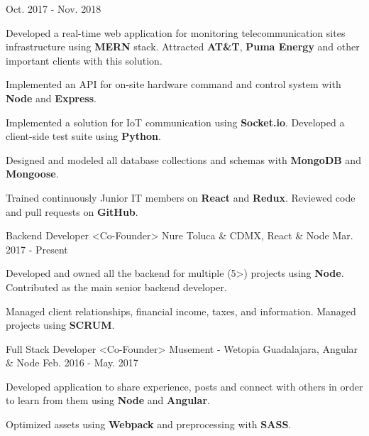 \begin{cventries}
    {Oct. 2017 - Nov. 2018}
    {
      \begin{cvitems}
        \item {Developed a real-time web application for monitoring telecommunication sites infrastructure using \textbf{MERN} stack. Attracted \textbf{AT\&T}, \textbf{Puma Energy} and other important clients with this solution.}
        \item {Implemented an API for on-site hardware command and control system with \textbf{Node} and \textbf{Express}.}
        \item {Implemented a solution for IoT communication using \textbf{Socket.io}. Developed a client-side test suite using \textbf{Python}.}
        \item {Designed and modeled all database collections and schemas with \textbf{MongoDB} and \textbf{Mongoose}.}
        \item {Trained continuously Junior IT members on \textbf{React} and \textbf{Redux}. Reviewed code and pull requests on \textbf{GitHub}.}
      \end{cvitems}
    }
    \cventry
      {Backend Developer <Co-Founder>}
      {Nure}
      {Toluca \& CDMX, React \& Node}
      {Mar. 2017 - Present}
      {
        \begin{cvitems}
          \item {Developed and owned all the backend for multiple (5>) projects using \textbf{Node}. Contributed as the main senior backend developer.}
           \item {Managed client relationships, financial income, taxes, and information. Managed projects using \textbf{SCRUM}.}
        \end{cvitems}
      }
    \cventry
      {Full Stack Developer <Co-Founder>}
      {Musement - Wetopia}
      {Guadalajara, Angular \& Node}
      {Feb. 2016 - May. 2017}
      {
        \begin{cvitems}
          \item {Developed application to share experience, posts and connect with others in order to learn from them using \textbf{Node} and \textbf{Angular}.}
          \item {Optimized assets using \textbf{Webpack} and preprocessing with \textbf{SASS}.}
        \end{cvitems}
      }
  \end{cventries}

